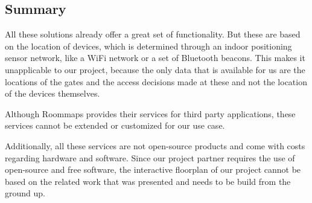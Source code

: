 \subsection{Summary}

All these solutions already offer a great set of functionality. But these are based on the location of devices, which is determined through an indoor positioning sensor network, like a WiFi network or a set of Bluetooth beacons. This makes it unapplicable to our project, because the only data that is available for us are the locations of the gates and the access decisions made at these and not the location of the devices themselves.

Although Roommaps provides their services for third party applications, these services cannot be extended or customized for our use case. 

Additionally, all these services are not open-source products and come with costs regarding hardware and software. Since our project partner requires the use of open-source and free software, the interactive floorplan of our project cannot be based on the related work that was presented and needs to be build from the ground up.

\clearpage